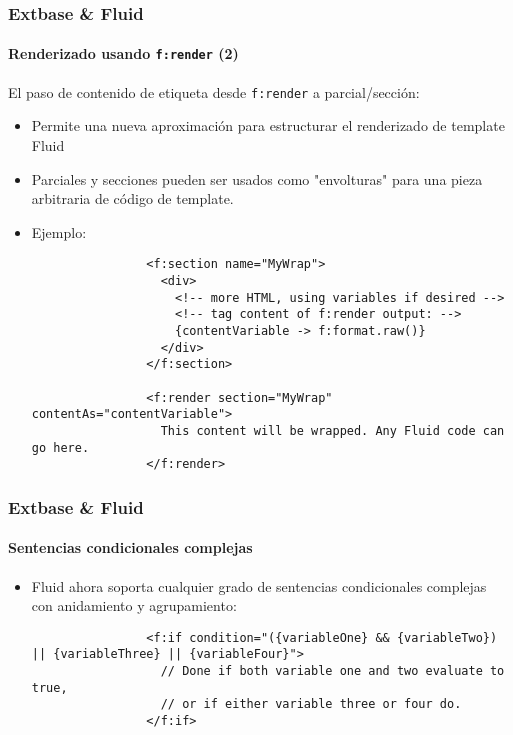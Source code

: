 \begin{frame}[fragile]
	\frametitle{Extbase \& Fluid}
	\framesubtitle{Renderizado usando \texttt{f:render} (2)}

	\lstset{basicstyle=\tiny\ttfamily}

	El paso de contenido de etiqueta desde \texttt{f:render} a parcial/sección:

	\begin{itemize}

		\item Permite una nueva aproximación para estructurar el renderizado de template Fluid

		\item Parciales y secciones pueden ser usados como "envolturas" para una pieza
			arbitraria de código de template.

		\item Ejemplo:

			\begin{lstlisting}
				<f:section name="MyWrap">
				  <div>
				    <!-- more HTML, using variables if desired -->
				    <!-- tag content of f:render output: -->
				    {contentVariable -> f:format.raw()}
				  </div>
				</f:section>

				<f:render section="MyWrap" contentAs="contentVariable">
				  This content will be wrapped. Any Fluid code can go here.
				</f:render>
			\end{lstlisting}

	\end{itemize}

\end{frame}


\begin{frame}[fragile]
	\frametitle{Extbase \& Fluid}
	\framesubtitle{Sentencias condicionales complejas}

	\lstset{basicstyle=\tiny\ttfamily}

	\begin{itemize}

		\item Fluid ahora soporta cualquier grado de sentencias condicionales complejas con
			anidamiento y agrupamiento:

			\begin{lstlisting}
				<f:if condition="({variableOne} && {variableTwo}) || {variableThree} || {variableFour}">
				  // Done if both variable one and two evaluate to true,
				  // or if either variable three or four do.
				</f:if>
			\end{lstlisting}

	\end{itemize}

\end{frame}

